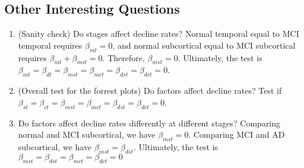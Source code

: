 \documentclass{article}
\begin{document}
\subsection{Other Interesting Questions}

\begin{enumerate}
\item (Sanity check) Do stages affect decline rates? Normal temporal equal to MCI temporal requires $\beta_{mt}=0$, and normal subcortical equal to MCI subcortical requires $\beta_{mt}+\beta_{mst}=0$. Therefore, $\beta_{mst}=0$. Ultimately, the test is $\beta_{mt}=\beta_{dt}=\beta_{mst}=\beta_{mct}=\beta_{dst}=\beta_{dct}=0$.
\item (Overall test for the forrest plots) Do factors affect decline rates? Test if $\beta_{st}=\beta_{ct}=\beta_{mst}=\beta_{mct}=\beta_{dst}=\beta_{dct}=0$.
\item Do factors affect decline rates differently at different stages? Comparing normal and MCI subcortical, we have $\beta_{mst}=0$. Comparing MCI and AD subcortical, we have $\beta_{mst}=\beta_{dst}$. Ultimately, the test is $\beta_{mst}=\beta_{dst}=\beta_{mct}=\beta_{dct}=0$
\end{enumerate}
\end{document}
